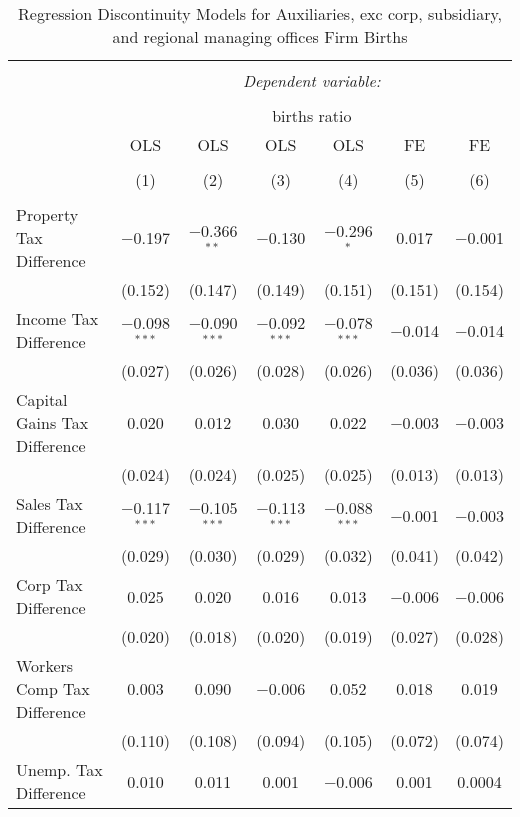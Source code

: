 
\begin{table}[!htbp] \centering 
  \caption{Regression Discontinuity Models for  Auxiliaries, exc corp, subsidiary, and regional managing offices Firm Births} 
  \label{95rd} 
\footnotesize 
\begin{tabular}{@{\extracolsep{5pt}}lcccccc} 
\\[-1.8ex]\hline 
\hline \\[-1.8ex] 
 & \multicolumn{6}{c}{\textit{Dependent variable:}} \\ 
\cline{2-7} 
\\[-1.8ex] & \multicolumn{6}{c}{births ratio} \\ 
 & OLS & OLS & OLS & OLS & FE & FE \\ 
\\[-1.8ex] & (1) & (2) & (3) & (4) & (5) & (6)\\ 
\hline \\[-1.8ex] 
 Property Tax Difference & $-$0.197 & $-$0.366$^{**}$ & $-$0.130 & $-$0.296$^{*}$ & 0.017 & $-$0.001 \\ 
  & (0.152) & (0.147) & (0.149) & (0.151) & (0.151) & (0.154) \\ 
  Income Tax Difference & $-$0.098$^{***}$ & $-$0.090$^{***}$ & $-$0.092$^{***}$ & $-$0.078$^{***}$ & $-$0.014 & $-$0.014 \\ 
  & (0.027) & (0.026) & (0.028) & (0.026) & (0.036) & (0.036) \\ 
  Capital Gains Tax Difference & 0.020 & 0.012 & 0.030 & 0.022 & $-$0.003 & $-$0.003 \\ 
  & (0.024) & (0.024) & (0.025) & (0.025) & (0.013) & (0.013) \\ 
  Sales Tax Difference & $-$0.117$^{***}$ & $-$0.105$^{***}$ & $-$0.113$^{***}$ & $-$0.088$^{***}$ & $-$0.001 & $-$0.003 \\ 
  & (0.029) & (0.030) & (0.029) & (0.032) & (0.041) & (0.042) \\ 
  Corp Tax Difference & 0.025 & 0.020 & 0.016 & 0.013 & $-$0.006 & $-$0.006 \\ 
  & (0.020) & (0.018) & (0.020) & (0.019) & (0.027) & (0.028) \\ 
  Workers Comp Tax Difference & 0.003 & 0.090 & $-$0.006 & 0.052 & 0.018 & 0.019 \\ 
  & (0.110) & (0.108) & (0.094) & (0.105) & (0.072) & (0.074) \\ 
  Unemp. Tax Difference & 0.010 & 0.011 & 0.001 & $-$0.006 & 0.001 & 0.0004 \\ 

\end{tabular}
\end{table}
